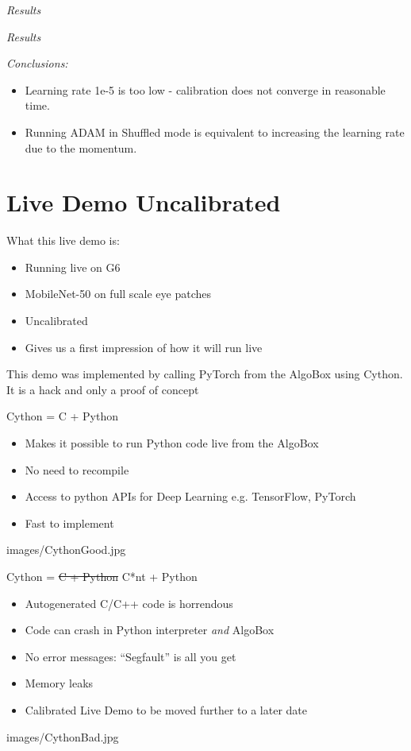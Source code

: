 \documentclass[aspectratio=1610,t,notes=hide]{beamer}
\begin{document}
{
\emph{Results}
 
}

{
\emph{Results}
 
}

{
\emph{Conclusions:}
\begin{itemize}
  \item Learning rate 1e-5 is too low - calibration does not converge in
  reasonable time.
  \item Running ADAM in Shuffled mode is equivalent to increasing the learning
  rate due to the momentum.
\end{itemize}
} 


\section{Live Demo Uncalibrated}

{
What this live demo is:
\begin{itemize}
  \item Running live on G6 
  \item MobileNet-50 on full scale eye patches
  \item Uncalibrated
  \item Gives us a first impression of how it will run live
\end{itemize}
This demo was implemented by calling PyTorch from the AlgoBox using Cython. It
is a hack and only a proof of concept
}

{
Cython = C + Python
\begin{itemize}
  \item Makes it possible to run Python code live from the AlgoBox
  \item No need to recompile
  \item Access to python APIs for Deep Learning e.g. TensorFlow, PyTorch
  \item Fast to implement
\end{itemize}
}
{images/CythonGood.jpg}

{
Cython = \st{C + Python} C*nt + Python
\begin{itemize}
  \item Autogenerated C/C++ code is horrendous
  \item Code can crash in Python interpreter \emph{and} AlgoBox
  \item No error messages: ``Segfault'' is all you get
  \item Memory leaks
  \item Calibrated Live Demo to be moved further to a later date
\end{itemize}
}
{images/CythonBad.jpg}

\end{document}
